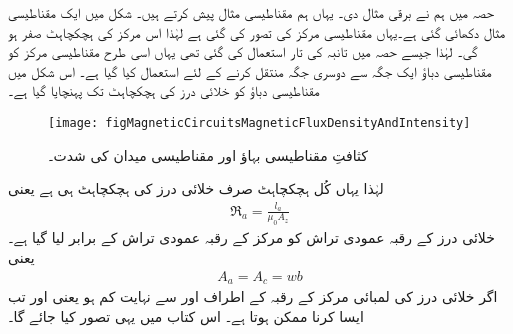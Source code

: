 حصہ   میں ہم نے برقی مثال دی۔ یہاں ہم مقناطیسی مثال پیش  کرتے ہیں۔ شکل  میں ایک مقناطیسی مثال دکھائی گئی ہے۔یہاں مقناطیسی مرکز کی  تصور کی گئی ہے لہٰذا اس مرکز کی ہچکچاہٹ  صفر ہو گی۔ لہٰذا جیسے حصہ    میں تانبہ کی تار استعمال کی گئی تھی یہاں اسی طرح مقناطیسی مرکز کو مقناطیسی دباؤ  ایک جگہ سے دوسری جگہ منتقل کرنے کے لئے استعمال کیا گیا ہے۔ اس شکل میں مقناطیسی دباؤ کو خلائی درز کی ہچکچاہٹ  تک پہنچایا گیا ہے۔
\begin{figure}
\centering
\texttt{[image: figMagneticCircuitsMagneticFluxDensityAndIntensity]}
\caption{کثافتِ مقناطیسی بہاؤ اور مقناطیسی میدان کی شدت۔}
\label{شکل_مقناطیسی__کثافت_مقناطیسی_بہاو_اور_شدت}
\end{figure}

لہٰذا یہاں کُل ہچکچاہٹ صرف خلائی درز کی ہچکچاہٹ ہی ہے یعنی
\begin{align}
\Re_a=\frac{l_a}{\mu_0 A_z}
\end{align}
خلائی درز کے رقبہ عمودی تراش  کو مرکز کے رقبہ عمودی تراش  کے برابر لیا گیا ہے۔ یعنی 
\begin{align}
A_a=A_c=w b
\end{align}
اگر خلائی درز کی لمبائی  مرکز کے رقبہ کے اطراف  اور  سے نہایت کم ہو یعنی  اور  تب ایسا کرنا ممکن ہوتا ہے۔ اس کتاب میں یہی تصور کیا جائے گا۔

